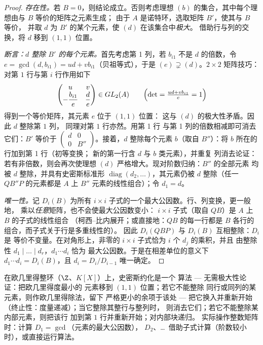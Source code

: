 \begin{proof}
\emph{存在性。}若 $B = 0$，则结论成立。否则考虑理想
$(b)$ 的集合，其中每个理想由与 $B$ 等价的矩阵之元素生成；
由于 $A$ 是诺特环，选取矩阵 $B'$，使其与 $B$ 等价，
并取 $d$ 为 $B'$ 的某个元素，使 $(d)$ 在该集合中\emph{极大}。
借助行与列的交换，将 $d$ 移到 $(1,1)$ 位置。

\emph{断言：$d$ 整除 $B'$ 的每个元素。}首先考虑第 1 列，若
$b_{i1}$ 不是 $d$ 的倍数，令 $e = \gcd(d, b_{i1}) = ud +
vb_{i1}$（贝祖等式），于是 $(e) \supsetneq (d)$。$2 \times 2$
矩阵技巧：对第 $1$ 行与第 $i$ 行作用如下
\[
\begin{pmatrix} u & v \\ -\dfrac{b_{i1}}e & \dfrac de
\end{pmatrix}
\in GL_2(A)
\qquad
\Bigl(\det = \tfrac{ud + v b_{i1}}e = 1\Bigr)
\]
得到一个等价矩阵，其元素 $e$ 位于 $(1,1)$ 位置：
这与 $(d)$ 的极大性矛盾。因此 $d$ 整除第 $1$ 列，
同理对第 $1$ 行亦然。用第 1 行
与第 1 列的倍数相减即可消去它们：$B'$ 等价于 $\begin{pmatrix} d &
0\\ 0 & B''\end{pmatrix}$。接着，$d$ 整除每个元素 $b$（取自
$B''$）：将 $b$ 所在的行加到第 1 行（初等变换；
新的第一行含 $d$ 与 $b$ 类元素），并重复
列消去论证：若有非倍数，则会再次使理想
$(d)$ 严格增大。现对阶数归纳：$B''$ 的全部元素
均被 $d$ 整除，并具有史密斯标准形 $\operatorname{diag}(d_2,
\dots)$，其元素仍被 $d$ 整除（任一
$QB''P$ 的元素都是 $A$ 上 $B''$ 元素的线性组合）；令 $d_1 =
d$。

\emph{唯一性。}记 $D_i(B)$ 为所有 $i \times i$
子式的一个最大公因数。行、列变换，更一般地，
乘以\emph{任意}矩阵，也不会使最大公因数变小：
$i \times i$ 子式（取自 $QB$）是 $A$ 上 $B$ 的子式的线性组合
（柯西--比内展开；或直接地：$QB$ 的每一行都是
$B$ 各行的组合，而子式关于行是多重线性的）。
因此 $D_i(QBP)$ 与 $D_i(B)$ 互相整除：$D_i$ 是
等价不变量。在对角形上，非零的 $i
\times i$ 子式恰为 $i$ 个 $d_j$ 的乘积，并且
由整除性 $d_1 \mid \dots \mid d_r$，$d_1 \cdots d_i$ 恰为
最大公因数。于是在相差单位的意义下 $d_1 \cdots d_i = D_i(B)$，且 $d_i =
D_i/D_{i-1}$ 唯一确定。
\end{proof}

\begin{method}\label{met:b3:modules:smith}
在欧几里得整环（$\Z$、$K[X]$）上，史密斯约化是一个
算法 --- 无需极大性论证：把欧几里得度最小的
元素移到 $(1,1)$ 位置；若它不能整除
同行或同列的某元素，则作欧几里得除法，留下
严格更小的余项于该处 --- 把它换入并重新开始
（终止性：度量递减）；当它整除其整行与整列时，
则消去它们；若它不能整除某内部元素，则把该行
加到第 $1$ 行并重新开始；对内部块递归。
实际操作整数矩阵时：计算 $D_1 = \gcd$（元素的最大公因数），
$D_2$、\dots\ 借助子式计算（阶数较小时），或直接运行算法。
\end{method}

